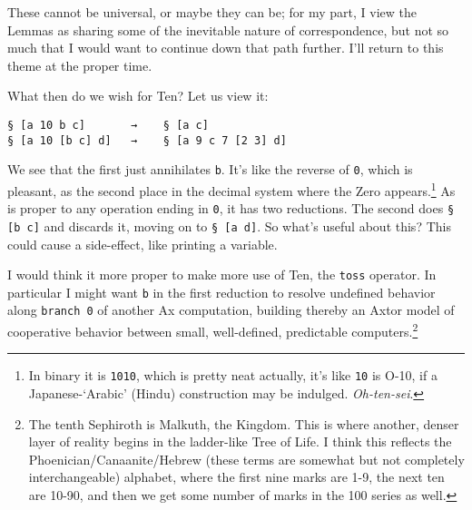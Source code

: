 \documentclass[twoside]{article}
\begin{document}
These cannot be universal, or maybe they can be; for my part, I view the Lemmas as sharing some of the inevitable nature of correspondence, but not so much that I would want to continue down that path further. I'll return to this theme at the proper time.

What then do we wish for Ten? Let us view it:

\begin{lstlisting}[style=listingcode]
§ [a 10 b c]       →    § [a c]
§ [a 10 [b c] d]   →    § [a 9 c 7 [2 3] d]
\end{lstlisting}

\noindent
We see that the first just annihilates \texttt{b}. It's like the reverse of \texttt{0}, which is pleasant, as the second place in the decimal system where the Zero appears.\footnote{In binary it is \texttt{1010}, which is pretty neat actually, it's like \texttt{10} is O-10, if a Japanese-`Arabic' (Hindu) construction may be indulged. \emph{Oh-ten-sei}.}  As is proper to any operation ending in \texttt{0}, it has two reductions. The second does \texttt{§ [b c]} and discards it, moving on to \texttt{§ [a d]}. So what's useful about this? This could cause a side-effect, like printing a variable.

\sloppy
I would think it more proper to make more use of Ten, the \texttt{toss} operator. In particular I might want \texttt{b} in the first reduction to resolve undefined behavior along \texttt{branch 0} of another Ax computation, building thereby an Axtor model of cooperative behavior between small, well-defined, predictable \mbox{computers}.\footnote{The tenth Sephiroth is Malkuth, the Kingdom. This is where another, denser layer of reality begins in the ladder-like Tree of Life. I think this reflects the Phoenician/Canaanite/Hebrew (these terms are somewhat but not completely interchangeable) alphabet, where the first nine marks are 1-9, the next ten are 10-90, and then we get some number of marks in the 100 series as well.}



\end{document}
